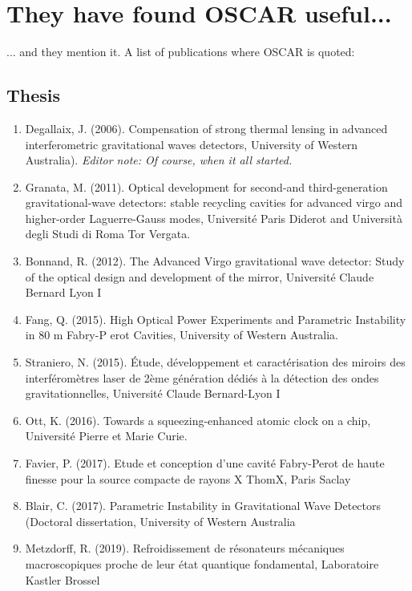 \chapter{They have found OSCAR useful...}
... and they mention it. A list of publications where OSCAR is quoted:

\section{Thesis}

\begin{enumerate}

\item Degallaix, J. (2006). Compensation of strong thermal lensing in advanced interferometric gravitational waves detectors, University of Western Australia). \emph{Editor note: Of course, when it all started.}

\item Granata, M. (2011). Optical development for second-and third-generation gravitational-wave detectors: stable recycling cavities for advanced virgo and higher-order Laguerre-Gauss modes, Université Paris Diderot and Università degli Studi di Roma Tor Vergata.

\item Bonnand, R. (2012). The Advanced Virgo gravitational wave detector: Study of the optical design and development of the mirror, Université Claude Bernard Lyon I

\item Fang, Q. (2015). High Optical Power Experiments and Parametric Instability in 80 m Fabry-P erot Cavities, University of Western Australia.

\item Straniero, N. (2015). Étude, développement et caractérisation des miroirs des interféromètres laser de 2ème génération dédiés à la détection des ondes gravitationnelles, Université Claude Bernard-Lyon I

\item Ott, K. (2016). Towards a squeezing-enhanced atomic clock on a chip, Université Pierre et Marie Curie.

\item Favier, P. (2017). Etude et conception d'une cavité Fabry-Perot de haute finesse pour la source compacte de rayons X ThomX, Paris Saclay

\item Blair, C. (2017). Parametric Instability in Gravitational Wave Detectors (Doctoral dissertation, University of Western Australia

\item Metzdorff, R. (2019). Refroidissement de résonateurs mécaniques macroscopiques proche de leur état quantique fondamental, Laboratoire Kastler Brossel

\end{enumerate}

